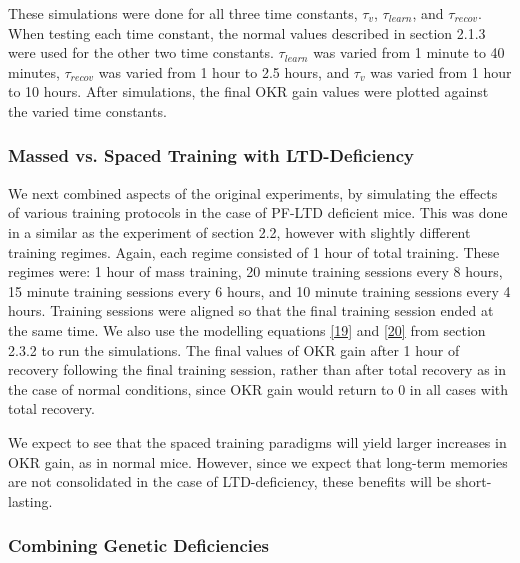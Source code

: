 \documentclass[10pt]{article}
\begin{document}
These simulations were done for all three time constants, \(\tau_v\), \(\tau_{learn}\), and \(\tau_{recov}\). When testing each time constant, the normal values described in section 2.1.3 were used for the other two time constants. \(\tau_{learn}\) was varied from 1 minute to 40 minutes, \(\tau_{recov}\) was varied from 1 hour to 2.5 hours, and \(\tau_v\) was varied from 1 hour to 10 hours. After simulations, the final OKR gain values were plotted against the varied time constants.

\subsubsection{Massed vs. Spaced Training with LTD-Deficiency}

We next combined aspects of the original experiments, by simulating the effects of various training protocols in the case of PF-LTD deficient mice. This was done in a similar as the experiment of section 2.2, however with slightly different training regimes. Again, each regime consisted of 1 hour of total training. These regimes were: 1 hour of mass training, 20 minute training sessions every 8 hours, 15 minute training sessions every 6 hours, and 10 minute training sessions every 4 hours. Training sessions were aligned so that the final training session ended at the same time. We also use the modelling equations \eqref{19} and \eqref{20} from section 2.3.2 to run the simulations. The final values of OKR gain after 1 hour of recovery following the final training session, rather than after total recovery as in the case of normal conditions, since OKR gain would return to 0 in all cases with total recovery.

We expect to see that the spaced training paradigms will yield larger increases in OKR gain, as in normal mice. However, since we expect that long-term memories are not consolidated in the case of LTD-deficiency, these benefits will be short-lasting.

\subsubsection{Combining Genetic Deficiencies}
\end{document}
